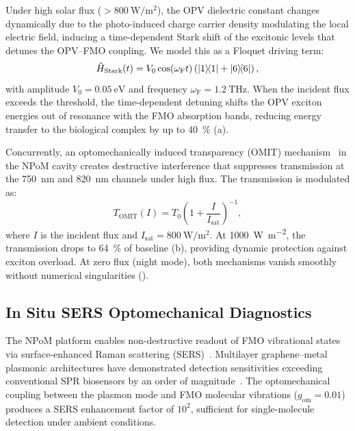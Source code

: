 \documentclass[12pt]{article}
\begin{document}
Under high solar flux ($> \SI{800}{\W\per\m\squared}$), the OPV dielectric constant changes dynamically due to the photo-induced charge carrier density modulating the local electric field, inducing a time-dependent Stark shift of the excitonic levels that detunes the OPV--FMO coupling.
We model this as a Floquet driving term:
\begin{equation}
\hat{H}_{\mathrm{Stark}}(t) = V_0 \cos(\omega_{\mathrm{F}} t) \left( \dyad{1}{1} + \dyad{6}{6} \right),
\label{eq:stark_detuning}
\end{equation}
with amplitude $V_0 = \SI{0.05}{\eV}$ and frequency $\omega_{\mathrm{F}} = \SI{1.2}{\THz}$.
When the incident flux exceeds the threshold, the time-dependent detuning shifts the OPV exciton energies out of resonance with the FMO absorption bands, reducing energy transfer to the biological complex by up to \SI{40}{\percent} (a).

Concurrently, an optomechanically induced transparency (OMIT) mechanism~\cite{Aspelmeyer2014} in the NPoM cavity creates destructive interference that suppresses transmission at the \SI{750}{\nm} and \SI{820}{\nm} channels under high flux.
The transmission is modulated as:
\begin{equation}
T_{\mathrm{OMIT}}(I) = T_0 \left(1 + \frac{I}{I_{\mathrm{sat}}}\right)^{-1},
\label{eq:omit}
\end{equation}
where $I$ is the incident flux and $I_{\mathrm{sat}} = \SI{800}{\W\per\m\squared}$.
At \SI{1000}{\W\per\m\squared}, the transmission drops to \SI{64}{\percent} of baseline (b), providing dynamic protection against exciton overload.
At zero flux (night mode), both mechanisms vanish smoothly without numerical singularities ().

\subsection*{In Situ SERS Optomechanical Diagnostics}

The NPoM platform enables non-destructive readout of FMO vibrational states via surface-enhanced Raman scattering (SERS)~\cite{Langer2020,CiallaMay2024}.
Multilayer graphene--metal plasmonic architectures have demonstrated detection sensitivities exceeding conventional SPR biosensors by an order of magnitude~\cite{Bahmani2026}.
The optomechanical coupling between the plasmon mode and FMO molecular vibrations ($g_{\mathrm{om}} = 0.01$) produces a SERS enhancement factor of $10^2$, sufficient for single-molecule detection under ambient conditions.
\end{document}
